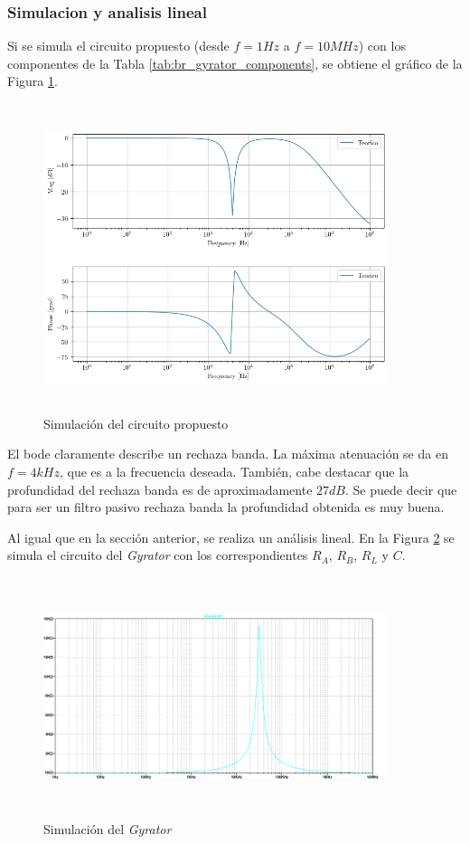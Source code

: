 \subsubsection{Simulacion y analisis lineal}
Si se simula el circuito propuesto (desde $f = 1 Hz$ a $f = 10MHz$) con los componentes de la Tabla \ref{tab:br_gyrator_components}, se obtiene el gráfico de la Figura \ref{ej2_br_sim}.

\begin{figure}[h!]                                                       
\centering\includegraphics[width=0.9\textwidth, height=9cm]{../Ex2/Resources/ej2_br_sim.png}
\caption{Simulación del circuito propuesto }
\label{ej2_br_sim}
\end{figure}

El bode claramente describe un rechaza banda. La máxima atenuación se da en $f= 4kHz$, que es a la frecuencia deseada. También, cabe destacar que la profundidad del rechaza banda es de aproximadamente $27 dB$. Se puede decir que para ser un filtro pasivo rechaza banda la profundidad obtenida es muy buena.  


Al igual que en la sección anterior, se realiza un análisis lineal. En la Figura \ref{fig:ej2_BR_gyrator_sim} se simula el circuito del \textit{Gyrator} con los correspondientes  $R_A$, $R_B$,  $R_L$ y $C$.



\begin{figure}[h!]                                                       
\centering\includegraphics[width=0.9\textwidth, height=7cm]{../Ex2/Resources/ej2_br_gyrator_sim.png}
\caption{Simulación del \textit{Gyrator} }
\label{fig:ej2_BR_gyrator_sim}
\end{figure}


